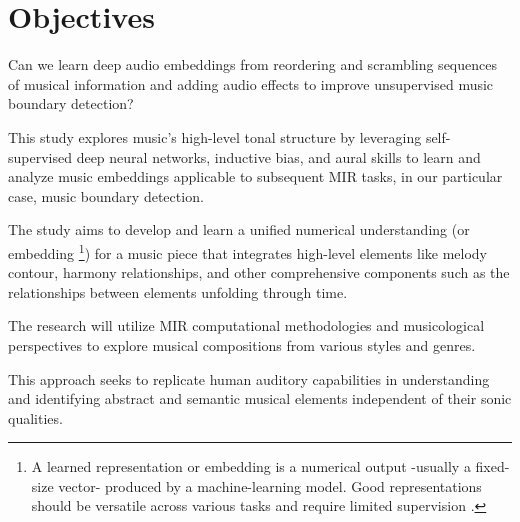 \section{Objectives}

Can we learn deep audio embeddings from reordering and scrambling sequences of musical information and adding audio effects to improve unsupervised music boundary detection?

This study explores music's high-level tonal structure by leveraging self-supervised deep neural networks, inductive bias, and aural skills to learn and analyze music embeddings applicable to subsequent MIR tasks, in our particular case, music boundary detection.

The study aims to develop and learn a unified numerical understanding (or embedding \footnote{A learned representation or embedding is a numerical output -usually a fixed-size vector- produced by a machine-learning model. Good representations should be versatile across various tasks and require limited supervision \cite{Turian2022HEAR:Representations}.}) for a music piece that integrates high-level elements like melody contour, harmony relationships, and other comprehensive components such as the relationships between elements unfolding through time. 

The research will utilize MIR computational methodologies and musicological perspectives to explore musical compositions from various styles and genres. 

This approach seeks to replicate human auditory capabilities in understanding and identifying abstract and semantic musical elements independent of their sonic qualities.